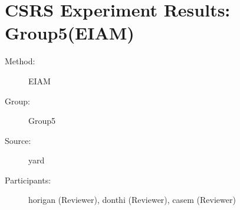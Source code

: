 \chapter {CSRS Experiment Results: Group5(EIAM)}	  
\small
	  

\begin{description}
\item [Method:] EIAM
\item [Group:] Group5
\item [Source:] yard
\item [Participants:] horigan (Reviewer), donthi (Reviewer), casem (Reviewer)
\end{description}
